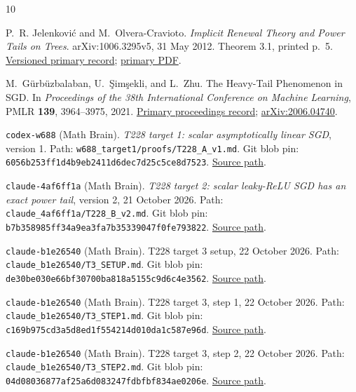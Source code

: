 \documentclass[11pt,a4paper]{article}
\numberwithin{equation}{section}
\theoremstyle{remark}
\newcommand{\sourcehash}[1]{{\small\texttt{#1}}}
\begin{document}
\begin{thebibliography}{10}
\raggedright
{}

P.~R. Jelenkovi\'c and M.~Olvera-Cravioto.
\emph{Implicit Renewal Theory and Power Tails on Trees}.
arXiv:1006.3295v5, 31 May 2012.
Theorem 3.1, printed p.~5.
\href{https://arxiv.org/abs/1006.3295v5}{Versioned primary record};
\href{https://arxiv.org/pdf/1006.3295}{primary PDF}.

M.~G\"urb\"uzbalaban, U.~\c{S}im\c{s}ekli, and L.~Zhu.
The Heavy-Tail Phenomenon in SGD.
In \emph{Proceedings of the 38th International Conference on Machine
Learning}, PMLR \textbf{139}, 3964--3975, 2021.
\href{https://proceedings.mlr.press/v139/gurbuzbalaban21a.html}
{Primary proceedings record};
\href{https://arxiv.org/abs/2006.04740}{arXiv:2006.04740}.

\texttt{codex-w688} (Math Brain).
\emph{T228 target 1: scalar asymptotically linear SGD}, version 1.
Path: \texttt{w688\_target1/proofs/T228\_A\_v1.md}.
Git blob pin: \sourcehash{6056b253ff1d4b9eb2411d6dec7d25c5ce8d7523}.
\href{https://github.com/<private-repo>/blob/main/06_math_research/frontier/rows/T228/w688_target1/proofs/T228_A_v1.md}
{Source path}.

\texttt{claude-4af6ff1a} (Math Brain).
\emph{T228 target 2: scalar leaky-ReLU SGD has an exact power tail},
version 2, 21 October 2026.
Path: \texttt{claude\_4af6ff1a/T228\_B\_v2.md}.
Git blob pin: \sourcehash{b7b358985ff34a9ea3fa7b35339047f0fe793822}.
\href{https://github.com/<private-repo>/blob/main/06_math_research/frontier/rows/T228/claude_4af6ff1a/T228_B_v2.md}
{Source path}.

\texttt{claude-b1e26540} (Math Brain).
T228 target 3 setup, 22 October 2026.
Path: \texttt{claude\_b1e26540/T3\_SETUP.md}.
Git blob pin: \sourcehash{de30be030e66bf30700ba818a5155c9d6c4e3562}.
\href{https://github.com/<private-repo>/blob/main/06_math_research/frontier/rows/T228/claude_b1e26540/T3_SETUP.md}
{Source path}.

\texttt{claude-b1e26540} (Math Brain).
T228 target 3, step 1, 22 October 2026.
Path: \texttt{claude\_b1e26540/T3\_STEP1.md}.
Git blob pin: \sourcehash{c169b975cd3a5d8ed1f554214d010da1c587e96d}.
\href{https://github.com/<private-repo>/blob/main/06_math_research/frontier/rows/T228/claude_b1e26540/T3_STEP1.md}
{Source path}.

\texttt{claude-b1e26540} (Math Brain).
T228 target 3, step 2, 22 October 2026.
Path: \texttt{claude\_b1e26540/T3\_STEP2.md}.
Git blob pin: \sourcehash{04d08036877af25a6d083247fdbfbf834ae0206e}.
\href{https://github.com/<private-repo>/blob/main/06_math_research/frontier/rows/T228/claude_b1e26540/T3_STEP2.md}
{Source path}.


\end{thebibliography}
\end{document}
